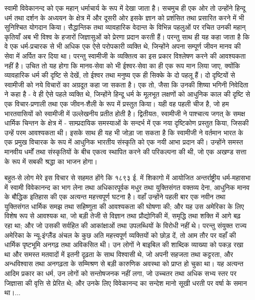 स्वामी विवेकानन्द को एक महान् धर्माचार्य के रूप में देखा जाता है। सचमुच ही एक ओर तो उन्होंने हिन्दू धर्म तथा दर्शन के अध्ययन के क्षेत्र में और दूसरी ओर इसके ज्ञान को प्रशंसित तथा प्रसारित करने में भी सुनिश्चित योगदान किया। सैद्धान्तिक तथा व्यावहारिक वेदान्त के विभिन्न पहलुओं पर रचित उनकी महान् कृतियाँ अब भी विश्व के हजारों जिज्ञासुओं को प्रेरणा प्रदान करती हैं। परन्तु साथ ही यह कहा जाता है कि वे एक धर्म-प्रचारक से भी अधिक एक ऐसे परोपकारी व्यक्ति थे, जिन्होंने अपना सम्पूर्ण जीवन मानव की सेवा में अर्पित कर दिया था। परन्तु स्वामीजी के व्यक्तित्व का इस प्रकार विश्लेषण करने की आवश्यकता नहीं है। उचित तो यह होगा कि मानव-सेवा को भी ईश्वर-सेवा का ही एक रूप मान लिया जाए, क्योंकि व्यावहारिक धर्म की दृष्टि से देखें, तो ईश्वर तथा मनुष्य एक ही सिक्के के दो पहलू हैं। दो दृष्टियों से स्वामीजी को नये विचारों का अग्रदूत कहा जा सकता है। एक तो, जैसा कि उनकी शिष्या भगिनी निवेदिता ने कहा है - वे ही ऐसे पहले व्यक्ति थे, जिन्होंने हिन्दू धर्म के मूलभूत लक्षणों को आधुनिक काल की दृष्टि से एक विचार-प्रणाली तथा एक जीवन-शैली के रूप में प्रस्तुत किया। यही वह पहली चीज है, जो हम भारतवासियों को स्वामीजी में उल्लेखनीय प्रतीत होती है। द्वितीयतः, स्वामीजी ने पाश्चात्य जगत् के समक्ष धार्मिक चिन्तन के क्षेत्र में - साम्प्रदायिक समस्याओं के सन्दर्भ में एक नया दृष्टिकोण प्रस्तुत किया, जिसकी उन्हें परम आवश्यकता थी। इसके साथ ही यह भी जोड़ा जा सकता है कि स्वामीजी ने वर्तमान भारत के एक प्रमुख विचारक के रूप में आधुनिक भारतीय संस्कृति को एक नयी आभा प्रदान की। उन्होंने समस्त मानवीय धर्मों तथा संस्कृतियों के बीच एकत्व स्थापित करने की परिकल्पना की थी, जो एक अखण्ड सत्ता के रूप में सबकी श्रद्धा का भाजन होगा। 

बहुत-से लोग मेरे इस विचार से सहमत होंगे कि १८९३ ई. में शिकागो में आयोजित अन्तर्राष्ट्रीय धर्म-महासभा में स्वामी विवेकानन्द का भाग लेना तथा अधिकारपूर्वक मधुर तथा युक्तिसंगत वक्तव्य देना, आधुनिक मानव के बौद्धिक इतिहास की एक अत्यन्त महत्त्वपूर्ण घटना है। वहाँ उन्होंने पहली बार एक नवीन तथा युक्तिसंगत धार्मिक समझ तथा सहिष्णुता की आवश्यकता की घोषणा की; और यह उस अमेरिका के लिए विशेष रूप से आवश्यक था, जो बड़ी तेजी से विज्ञान तथा प्रौद्योगिकी में, समृद्धि तथा शक्ति में आगे बढ़ रहा था; और जो उसकी सर्वहित की आकांक्षाओं तथा उपलब्धियों के विरोधी नहीं थे। परन्तु संयुक्त राज्य अमेरिका के न्यू-इंग्लैंड अंचल के कुछ अति महत्त्वपूर्ण व्यक्तियों को छोड़ दें, तो आम तौर पर वहाँ की धार्मिक पृष्टभूमि अनगढ़ तथा अविकसित थी। उन लोगों ने बाइबिल की शाब्दिक व्याख्या को पकड़ रखा था और समस्त मतवादों में इतनी दृढ़ता के साथ विश्वासी थे, जो अपनी सहजता तथा कट्टरता, और अन्धविश्वास तथा अनगढ़ता के सम्मिश्रण से बड़ी कारुणिक अवस्था को प्राप्त हो चुका था। यह अत्यन्त आदिम प्रकार का धर्म, उन लोगों को सन्तोषजनक नहीं लगा, जो उच्चतर तथा अधिक सभ्य स्तर पर जिज्ञासा की वृत्ति से प्रेरित थे; और उनके लिए विवेकानन्द का सन्देश मानो सूखी धरती पर वर्षा के समान था।... 

